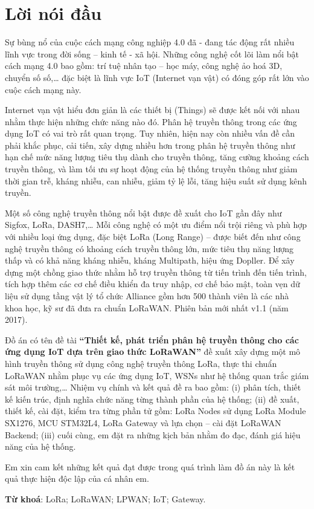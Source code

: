 \thispagestyle{plain}
\chapter*{Lời nói đầu}

Sự bùng nổ của cuộc cách mạng công nghiệp 4.0 đã - đang tác động rất nhiều lĩnh vực trong đời sống – kinh tế - xã hội. Những công nghệ cốt lõi làm nổi bật cách mạng 4.0 bao gồm: trí tuệ nhân tạo – học máy, công nghệ ảo hoá 3D, chuyển số số,… đặc biệt là lĩnh vực IoT (Internet vạn vật) có đóng góp rất lớn vào cuộc cách mạng này. \par
	Internet vạn vật hiểu đơn giản là các thiết bị (Things) sẽ được kết nối với nhau nhằm thực hiện những chức năng nào đó. Phân hệ truyền thông trong các ứng dụng IoT có vai trò rất quan trọng. Tuy nhiên, hiện nay còn nhiều vấn đề cần phải khắc phục, cải tiến, xây dựng nhiều hơn trong phân hệ truyền thông như hạn chế mức năng lượng tiêu thụ dành cho truyền thông, tăng cường khoảng cách truyền thông, và làm tối ưu sự hoạt động của hệ thống truyền thông như giảm thời gian trễ, kháng nhiễu, can nhiễu, giảm tỷ lệ lỗi, tăng hiệu suất sử dụng kênh truyền. \par 
	Một số công nghệ truyền thông nổi bật được đề xuất cho IoT gần đây như Sigfox, LoRa, DASH7,… Mỗi công nghệ có một ưu điểm nổi trội riêng và phù hợp với nhiều loại ứng dụng, đặc biệt LoRa (Long Range) – được biết đến như công nghệ truyền thông có khoảng cách truyền thông lớn, mức tiêu thụ năng lượng thấp và có khả năng kháng nhiễu, kháng Multipath, hiệu ứng Dopller. Để xây dựng một chồng giao thức nhằm hỗ trợ truyền thông từ tiến trình đến tiến trình, tích hợp thêm các cơ chế điều khiển đa truy nhập, cơ chế bảo mật, toàn vẹn dữ liệu sử dụng tầng vật lý tổ chức Alliance gồm hơn 500 thành viên là các nhà khoa học, kỹ sư đã đưa ra chuẩn LoRaWAN. Phiên bản mới nhất v1.1 (năm 2017). \par
	Đồ án có tên đề tài \textbf{“Thiết kế, phát triển phân hệ truyền thông cho các ứng dụng IoT dựa trên giao thức LoRaWAN”} đề xuất xây dựng một mô hình truyền thông sử dụng công nghệ truyền thông LoRa, thực thi chuẩn LoRaWAN nhằm phục vụ các ứng dụng IoT, WSNs như hệ thống quan trắc giám sát môi trường,… Nhiệm vụ chính và kết quả đề ra bao gồm: (i) phân tích, thiết kế kiến trúc, định nghĩa chức năng từng thành phần của hệ thống; (ii) đề xuất, thiết kế, cài đặt, kiểm tra từng phần tử gồm: LoRa Nodes sử dụng LoRa Module SX1276, MCU STM32L4, LoRa Gateway và lựa chọn – cài đặt LoRaWAN Backend; (iii) cuối cùng, em đặt ra những kịch bản nhằm đo đạc, đánh giá hiệu năng của hệ thống. \par
	Em xin cam kết những kết quả đạt được trong quá trình làm đồ án này là kết quả thực hiện độc lập của cá nhân em. \par

\textbf{Từ khoá}: LoRa; LoRaWAN; LPWAN; IoT; Gateway.
 